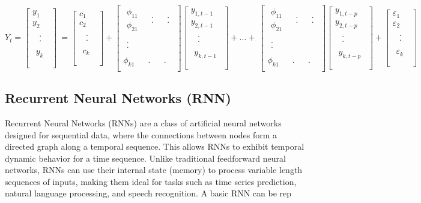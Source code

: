 \documentclass{ieeeojies}
\begin{document}
\begin{dmath*}
    Y_t=\left[\begin{matrix}y_1\\y_2\\\begin{matrix}\begin{matrix}.\\.\\\end{matrix}\\y_k\\\end{matrix}\\\end{matrix}\right]\ =\left[\begin{matrix}c_1\\c_2\\\begin{matrix}\begin{matrix}.\\.\\\end{matrix}\\c_k\\\end{matrix}\\\end{matrix}\right]+\left[\begin{matrix}\begin{matrix}\phi_{11}\\\phi_{21}\\\end{matrix}&\begin{matrix}.\\.\\\end{matrix}&\begin{matrix}.\\.\\\end{matrix}\\\begin{matrix}.\\.\\\end{matrix}&\ &\ \\\phi_{k1}&.&.\\\end{matrix}\right]\left[\begin{matrix}y_{1,t-1}\\y_{2,t-1}\\\begin{matrix}\begin{matrix}.\\.\\\end{matrix}\\y_{k,t-1}\\\end{matrix}\\\end{matrix}\right]+...+\ \left[\begin{matrix}\begin{matrix}\phi_{11}\\\phi_{21}\\\end{matrix}&\begin{matrix}.\\.\\\end{matrix}&\begin{matrix}.\\.\\\end{matrix}\\\begin{matrix}.\\.\\\end{matrix}&\ &\ \\\phi_{k1}&.&.\\\end{matrix}\right]\left[\begin{matrix}y_{1,t-p}\\y_{2,t-p}\\\begin{matrix}\begin{matrix}.\\.\\\end{matrix}\\y_{k,t-p}\\\end{matrix}\\\end{matrix}\right]+\left[\begin{matrix}\varepsilon_1\\\varepsilon_2\\\begin{matrix}\begin{matrix}.\\.\\\end{matrix}\\\varepsilon_k\\\end{matrix}\\\end{matrix}\right]
\end{dmath*}

\subsection{Recurrent Neural Networks (RNN)}
Recurrent Neural Networks (RNNs) are a class of artificial neural networks designed for sequential data, where the connections between nodes form a directed graph along a temporal sequence. This allows RNNs to exhibit temporal dynamic behavior for a time sequence. Unlike traditional feedforward neural networks, RNNs can use their internal state (memory) to process variable length sequences of inputs, making them ideal for tasks such as time series prediction, natural language processing, and speech recognition.
A basic RNN can be rep
\end{document}
